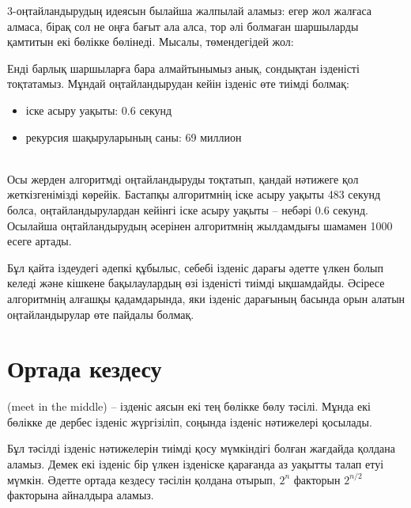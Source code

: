 3-оңтайландырудың идеясын былайша жалпылай аламыз:
егер жол жалғаса алмаса, бірақ сол не оңға
бағыт ала алса, тор әлі болмаған шаршыларды
қамтитын екі бөлікке бөлінеді. Мысалы, төмендегідей жол:

\begin{center}
\end{center}
Енді барлық шаршыларға бара алмайтынымыз анық, сондықтан ізденісті тоқтатамыз.
Мұндай оңтайландырудан кейін ізденіс өте тиімді болмақ:

\begin{itemize}
\item
іске асыру уақыты: 0.6 секунд
\item
рекурсия шақыруларының саны: 69 миллион
\end{itemize}

~\\
Осы жерден алгоритмді оңтайландыруды тоқтатып,
қандай нәтижеге қол жеткізгенімізді көрейік.
Бастапқы алгоритмнің іске асыру уақыты 483 секунд болса,
оңтайландырулардан кейінгі іске асыру уақыты -- небәрі 0.6 секунд.
Осылайша оңтайландырудың әсерінен алгоритмнің жылдамдығы шамамен 1000 есеге артады.

Бұл қайта іздеудегі әдепкі құбылыс,
себебі ізденіс дарағы әдетте үлкен болып келеді және кішкене
бақылаулардың өзі ізденісті тиімді ықшамдайды.
Әсіресе алгоритмнің алғашқы қадамдарында, яки 
ізденіс дарағының басында орын 
алатын оңтайландырулар өте пайдалы болмақ.

\section{Ортада кездесу}


 (meet in the middle) --
ізденіс аясын екі тең бөлікке бөлу тәсілі.
Мұнда екі бөлікке де дербес ізденіс жүргізіліп,
соңында ізденіс нәтижелері қосылады.

Бұл тәсілді ізденіс нәтижелерін тиімді қосу мүмкіндігі
болған жағдайда қолдана аламыз.
Демек екі ізденіс бір үлкен ізденіске қарағанда аз уақытты талап етуі мүмкін.
Әдетте ортада кездесу тәсілін қолдана отырып, $2^n$ факторын $2^{n/2}$ факторына айналдыра аламыз.

